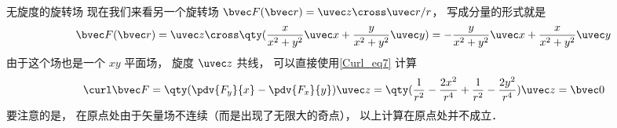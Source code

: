 \begin{example}{无旋度的旋转场}
现在我们来看另一个旋转场 $\bvec F(\bvec r) = \uvec z\cross\uvec r /r$， 写成分量的形式就是
\begin{equation}
\bvec F(\bvec r) = \uvec z \cross \qty(\frac{x}{x^2 + y^2}\uvec x + \frac{y}{x^2 + y^2}\uvec y) = -\frac{y}{x^2 + y^2} \uvec x + \frac{x}{x^2 + y^2}\uvec y
\end{equation}
由于这个场也是一个 $xy$ 平面场， 旋度 $\uvec z$ 共线， 可以直接使用\autoref{Curl_eq7} 计算
\begin{equation}
\curl\bvec F = \qty(\pdv{F_y}{x} - \pdv{F_x}{y})\uvec z = \qty(\frac{1}{r^2} - \frac{2x^2}{r^4} + \frac{1}{r^2} - \frac{2y^2}{r^4})\uvec z = \bvec 0
\end{equation}
要注意的是， 在原点处由于矢量场不连续（而是出现了无限大的奇点）， 以上计算在原点处并不成立． 
\end{example}
